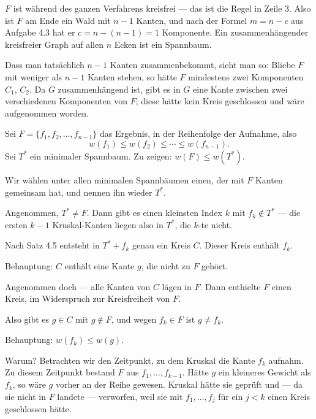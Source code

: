 \begin{merksatz}
$F$ ist während des ganzen Verfahrens kreisfrei --- das ist die Regel in Zeile 3. Also ist $F$ am Ende ein Wald mit $n-1$ Kanten, und nach der Formel $m = n - c$ aus Aufgabe 4.3 hat er $c = n - (n-1) = 1$ Komponente. Ein zusammenhängender kreisfreier Graph auf allen $n$ Ecken ist ein Spannbaum.

Dass man tatsächlich $n-1$ Kanten zusammenbekommt, sieht man so: Bliebe $F$ mit weniger als $n-1$ Kanten stehen, so hätte $F$ mindestens zwei Komponenten $C_1$, $C_2$. Da $G$ zusammenhängend ist, gibt es in $G$ eine Kante zwischen zwei verschiedenen Komponenten von $F$; diese hätte kein Kreis geschlossen und wäre aufgenommen worden.

Sei $F = \{f_1, f_2, \ldots, f_{n-1}\}$ das Ergebnis, in der Reihenfolge der Aufnahme, also
\[ w(f_1) \le w(f_2) \le \cdots \le w(f_{n-1}) . \]
Sei $T^{*}$ ein minimaler Spannbaum. Zu zeigen: $w(F) \le w(T^{*})$.

Wir wählen unter allen minimalen Spannbäumen einen, der mit $F$  Kanten gemeinsam hat, und nennen ihn wieder $T^{*}$.

Angenommen, $T^{*} \neq F$. Dann gibt es einen kleinsten Index $k$ mit $f_k \notin T^{*}$ --- die ersten $k-1$ Kruskal-Kanten liegen also in $T^{*}$, die $k$-te nicht.

Nach Satz 4.5 entsteht in $T^{*} + f_k$ genau ein Kreis $C$. Dieser Kreis enthält $f_k$.

Behauptung: $C$ enthält eine Kante $g$, die nicht zu $F$ gehört.

Angenommen doch --- alle Kanten von $C$ lägen in $F$. Dann enthielte $F$ einen Kreis, im Widerspruch zur Kreisfreiheit von $F$.

Also gibt es $g \in C$ mit $g \notin F$, und wegen $f_k \in F$ ist $g \neq f_k$.

Behauptung: $w(f_k) \le w(g)$.

Warum? Betrachten wir den Zeitpunkt, zu dem Kruskal die Kante $f_k$ aufnahm. Zu diesem Zeitpunkt bestand $F$ aus $f_1, \ldots, f_{k-1}$. Hätte $g$ ein kleineres Gewicht als $f_k$, so wäre $g$ vorher an der Reihe gewesen. Kruskal hätte sie geprüft und --- da sie nicht in $F$ landete --- verworfen, weil sie mit $f_1, \ldots, f_{j}$ für ein $j < k$ einen Kreis geschlossen hätte.


\end{merksatz}

